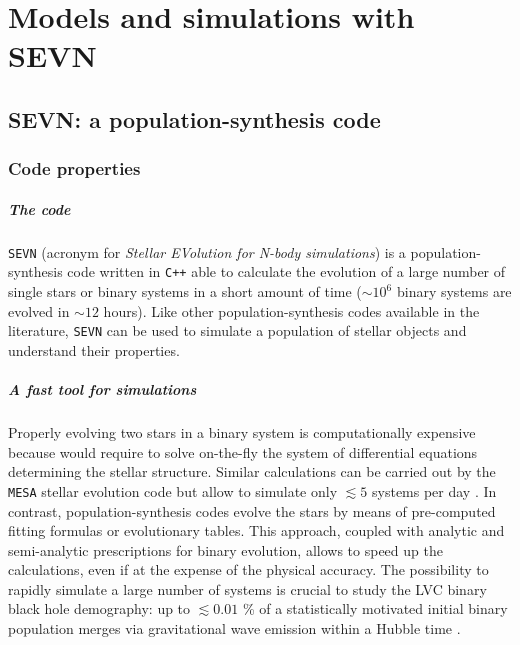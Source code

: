 \documentclass[a4paper,titlepage]{book}     	%
\begin{document}







\chapter{Models and simulations with SEVN}%

\section{SEVN: a population-synthesis code}\label{sec:SEVN}
\subsection{Code properties}
\paragraph{The code} \texttt{SEVN} (acronym for \emph{Stellar EVolution for N-body simulations}) is a population-synthesis code written in \texttt{C++} able to calculate the evolution of a large number of single stars or binary systems in a short amount of time ($\sim 10^{6}$ binary systems are evolved in $\sim 12$ hours)\cite{spera2019_mergingBBH}. Like other population-synthesis codes available in the literature, \texttt{SEVN} can be used to simulate a population of stellar objects and understand their properties.

\paragraph{A fast tool for simulations} Properly evolving two stars in a binary system is computationally expensive because would require to solve on-the-fly the system of differential equations determining the stellar structure. Similar calculations can be carried out by the \texttt{MESA} stellar evolution code but allow to simulate only $\lesssim 5$ systems per day \cite{MESA2015BinaryMT}. In contrast, population-synthesis codes evolve the stars by means of pre-computed fitting formulas or evolutionary tables. This approach, coupled with analytic and semi-analytic prescriptions for binary evolution, allows to speed up the calculations, even if at the expense of the physical accuracy. The possibility to rapidly simulate a large number of systems is crucial to study the LVC binary black hole demography: up to $\lesssim 0.01$ \% of a statistically motivated initial binary population merges via gravitational wave emission within a Hubble time \cite{spera2019_mergingBBH}.
\end{document}
